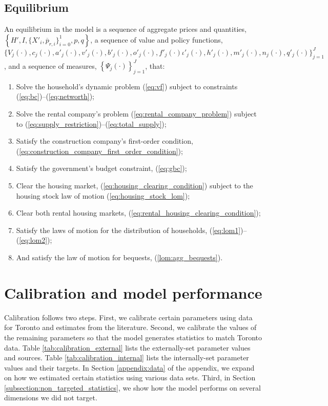 \documentclass[parskip=full]{article}
\begin{document}
\subsection{Equilibrium}
An equilibrium in the model is a sequence of aggregate prices and quantities, $\left\{H',I,\{X'_{i},\overline{p}_{r,i}\}^{1}_{i=0},p,q\right\}$, a sequence of value and policy functions, $\biggl\{V_{j}(\cdot),c_{j}(\cdot),a'_{j}(\cdot),v'_{j}(\cdot),b'_{j}(\cdot),o'_{j}(\cdot),f'_{j}(\cdot)\iota'_{j}(\cdot),h'_{j}(\cdot),m'_{j}(\cdot),n_{j}(\cdot),q'_{j}(\cdot)\biggl\}_{j=1}^J$, and a sequence of measures, $\left\{\Psi_{j}(\cdot)\right\}_{j=1}^J$, that:
\begin{enumerate}
\item Solve the household's dynamic problem (\ref{eq:vf}) subject to constraints (\ref{eq:bc})--(\ref{eq:networth});
\item Solve the rental company's problem (\ref{eq:rental_company_problem}) subject to (\ref{eq:supply_restriction})--(\ref{eq:total_supply});
\item Satisfy the construction company's first-order condition, (\ref{eq:construction_company_first_order_condition});
\item Satisfy the government's budget constraint, (\ref{eq:gbc});
\item Clear the housing market,
(\ref{eq:housing_clearing_condition}) subject to the housing stock law of motion (\ref{eq:housing_stock_lom});
\item Clear both rental housing markets,
(\ref{eq:rental_housing_clearing_condition});
\item Satisfy the laws of motion for the distribution of households, (\ref{eq:lom1})--(\ref{eq:lom2});
\item And satisfy the law of motion for bequests, (\ref{lom:agg_bequests}).
\end{enumerate}

\section{Calibration and model performance}\label{sec:calibration}

Calibration follows two steps. First, we calibrate certain parameters using data for Toronto and estimates from the literature. Second, we calibrate the values of the remaining parameters so that the model generates statistics to match Toronto data. Table \ref{tab:calibration_external} lists the externally-set parameter values and sources. Table \ref{tab:calibration_internal} lists the internally-set parameter values and their targets. In Section \ref{appendix:data} of the appendix, we expand on how we estimated certain statistics using various data sets. Third, in Section \ref{subsection:non_targeted_statistics}, we show how the model performs on several dimensions we did not target. 
\end{document}
